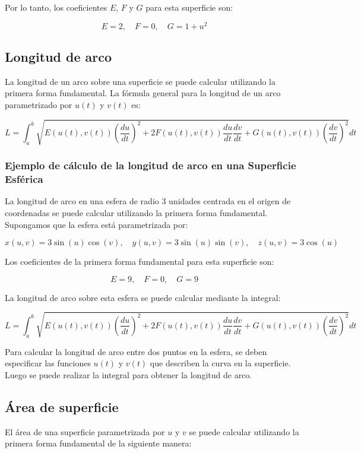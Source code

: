 \documentclass{article}
\begin{document}
	Por lo tanto, los coeficientes $E$, $F$ y $G$ para esta superficie son:
	
	$$ E = 2, \quad F = 0, \quad G = 1 + u^2 $$
	
	\subsection{Longitud de arco}
	
	La longitud de un arco sobre una superficie se puede calcular utilizando la primera forma fundamental. La fórmula general para la longitud de un arco parametrizado por $u(t)$ y $v(t)$ es:
	
	$$ L = \int_{a}^{b} \sqrt{E(u(t),v(t)) \left( \frac{du}{dt} \right)^2 + 2F(u(t),v(t)) \frac{du}{dt} \frac{dv}{dt} + G(u(t),v(t)) \left( \frac{dv}{dt} \right)^2} dt $$
	
	\subsubsection{Ejemplo de cálculo de la longitud de arco en una Superficie Esférica}
	
	La longitud de arco en una esfera de radio 3 unidades centrada en el origen de coordenadas se puede calcular utilizando la primera forma fundamental. Supongamos que la esfera está parametrizada por:
	
	$$ x(u,v) = 3 \sin(u) \cos(v), \quad y(u,v) = 3 \sin(u) \sin(v), \quad z(u,v) = 3 \cos(u) $$
	
	Los coeficientes de la primera forma fundamental para esta superficie son:
	
	$$ E = 9, \quad F = 0, \quad G = 9 $$
	
	La longitud de arco sobre esta esfera se puede calcular mediante la integral:
	
	$$ L = \int_{a}^{b} \sqrt{E(u(t),v(t)) \left( \frac{du}{dt} \right)^2 + 2F(u(t),v(t)) \frac{du}{dt} \frac{dv}{dt} + G(u(t),v(t)) \left( \frac{dv}{dt} \right)^2} dt $$
	
	Para calcular la longitud de arco entre dos puntos en la esfera, se deben especificar las funciones $u(t)$ y $v(t)$ que describen la curva en la superficie. Luego se puede realizar la integral para obtener la longitud de arco.
	
	\subsection{Área de superficie}
	
	El área de una superficie parametrizada por $u$ y $v$ se puede calcular utilizando la primera forma fundamental de la siguiente manera:
	
\end{document}
